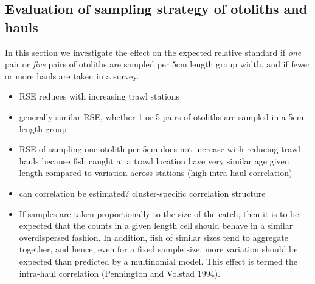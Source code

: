 \documentclass[a4paper 12pt]{article}
\numberwithin{equation}{section}
\begin{document}
\begin{figure}[h!]
\begin{tabular}{@{}ccc@{}}
\end{tabular}
\end{figure} 



\subsection{Evaluation of sampling strategy of otoliths and hauls}
\label{sec:optimumeffortresultsHaul}
In this section we investigate the effect on the expected relative standard if \textit{one} pair or \textit{five} pairs of otoliths are sampled per 5cm length group width, and if fewer or more hauls are taken in a survey.  

\begin{itemize}
\item RSE reduces with increasing trawl stations
\item generally similar RSE, whether 1 or 5 pairs of otoliths are sampled in a 5cm length group
\item RSE of sampling one otolith per 5cm does not increase with reducing trawl hauls because fish caught at a trawl location have very similar age given length compared to variation across stations (high intra-haul correlation)
\item can correlation be estimated? cluster-specific correlation structure
\item  If samples are taken proportionally to the size of the catch, then it is to be expected that the counts in a given length cell should behave in a similar overdispersed fashion. In addition, fish of similar sizes tend to aggregate together, and hence, even for a fixed sample size, more variation should be expected than predicted by a multinomial model. This effect is termed the intra-haul correlation (Pennington and Volstad 1994).
\end{itemize}
\end{document}

